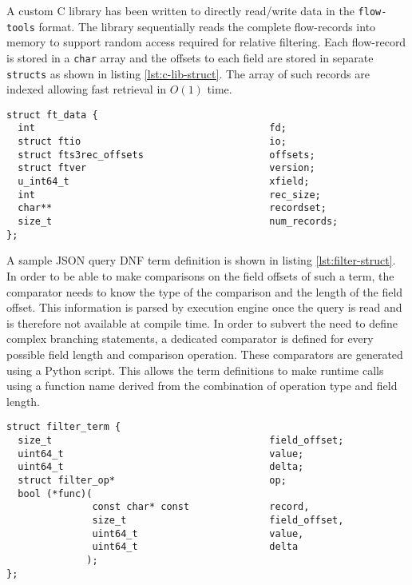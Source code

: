 A custom C library has been written to directly read/write data in the
\texttt{flow-tools} format. The library sequentially reads the complete
flow-records into memory to support random access required for relative
filtering. Each flow-record is stored in a \texttt{char} array and the offsets
to each field are stored in separate \texttt{structs} as shown in listing
\ref{lst:c-lib-struct}. The array of such records are indexed allowing fast
retrieval in $O(1)$ time.

\begin{lstlisting}
struct ft_data {
  int                                         fd;
  struct ftio                                 io;
  struct fts3rec_offsets                      offsets;
  struct ftver                                version;
  u_int64_t                                   xfield;
  int                                         rec_size;
  char**                                      recordset;
  size_t                                      num_records;
};
\end{lstlisting}

A sample JSON query \ac{DNF} term definition is shown in listing
\ref{lst:filter-struct}. In order to be able to make comparisons on the field
offsets of such a term, the comparator needs to know the type of the
comparison and the length of the field offset. This information is parsed by
execution engine once the query is read and is therefore not available at
compile time.  In order to subvert the need to define complex branching
statements, a dedicated comparator is defined for every possible field length
and comparison operation. These comparators are generated using a Python
script. This allows the term definitions to make runtime calls using a
function name derived from the combination of operation type and field length.

\begin{lstlisting}
struct filter_term {
  size_t                                      field_offset;
  uint64_t                                    value;
  uint64_t                                    delta;
  struct filter_op*                           op;
  bool (*func)(
               const char* const              record,
               size_t                         field_offset,
               uint64_t                       value,
               uint64_t                       delta
              );
};
\end{lstlisting}

